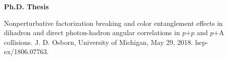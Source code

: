 \documentclass[11pt]{article}
\begin{document}
\vspace{3pt}


\begin{flushleft}
\Large\textbf{Ph.D. Thesis} \\
\normalsize

		Nonperturbative factorization breaking and color entanglement effects in dihadron and direct photon-hadron angular correlations in $p$$+$$p$ and $p$$+$A collisions. J. D. Osborn, University of Michigan, May 29, 2018. hep-ex/1806.07763.
	
	\end{flushleft}





\end{document}
